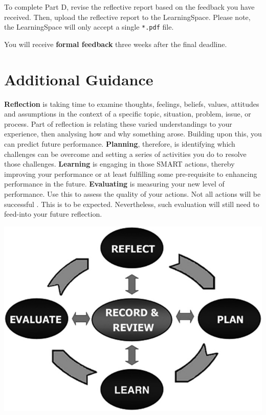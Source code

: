 \documentclass{../../fal_assignment}
\begin{document}
To complete Part D, revise the reflective report based on the feedback you have received. Then, upload the reflective report to the LearningSpace. Please note, the LearningSpace will only accept a single \texttt{*.pdf} file.

You will receive \textbf{formal feedback} three weeks after the final deadline.

\section*{Additional Guidance}

\textbf{Reflection} is taking time to examine thoughts, feelings, beliefs, values, attitudes and assumptions in the context of a specific topic, situation, problem, issue, or process. Part of reflection is relating these varied understandings to your experience, then analysing how and why something arose. Building upon this, you can predict future performance. \textbf{Planning}, therefore, is identifying which challenges can be overcome and setting a series of activities you do to resolve those challenges. \textbf{Learning} is engaging in those SMART actions, thereby improving your performance or at least fulfilling some pre-requisite to enhancing performance in the future. \textbf{Evaluating} is measuring your new level of performance. Use this to assess the quality of your actions. Not all actions will be successful . This is to be expected. Nevertheless, such evaluation will still need to feed-into your future reflection.

\begin{center}
    \includegraphics[scale=3]{ajpe798112-fig1} 
\end{center}
\end{document}
